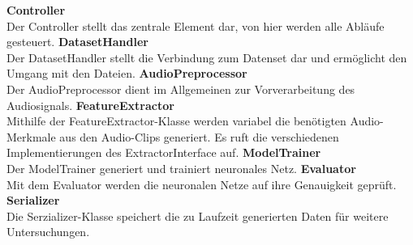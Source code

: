 \noindent \textbf{Controller}\\
Der Controller stellt das zentrale Element dar, von hier werden alle Abläufe gesteuert.
\newline
\noindent \textbf{DatasetHandler}\\
Der DatasetHandler stellt die Verbindung zum Datenset dar und ermöglicht den Umgang mit den Dateien.
\newline
\noindent \textbf{AudioPreprocessor}\\
Der AudioPreprocessor dient im Allgemeinen zur Vorverarbeitung des Audiosignals.
\newline
\noindent \textbf{FeatureExtractor}\\
Mithilfe der FeatureExtractor-Klasse werden variabel die benötigten Audio-Merkmale aus den Audio-Clips generiert. Es ruft die verschiedenen Implementierungen des ExtractorInterface auf.
\newline
\noindent \textbf{ModelTrainer}\\
Der ModelTrainer generiert und trainiert neuronales Netz.
\newline
\noindent \textbf{Evaluator}\\
Mit dem Evaluator werden die neuronalen Netze auf ihre Genauigkeit geprüft.
\newline
\noindent \textbf{Serializer}\\
Die Serzializer-Klasse speichert die zu Laufzeit generierten Daten für weitere Untersuchungen.
\newparagraph

